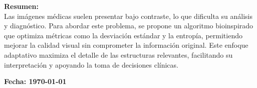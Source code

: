\begin{titlepage}
\begin{center}
\begin{minipage}{0.8\textwidth}
        \end{minipage}

        \begin{minipage}{0.8\textwidth}
            \textbf{Resumen:}\\[0.3cm]
            Las imágenes médicas suelen presentar bajo contraste, lo que dificulta su análisis y diagnóstico. Para abordar este problema, se propone un algoritmo bioinspirado que optimiza métricas como la desviación estándar y la entropía, permitiendo mejorar la calidad visual sin comprometer la información original. Este enfoque adaptativo maximiza el detalle de las estructuras relevantes, facilitando su interpretación y apoyando la toma de decisiones clínicas.
        \end{minipage}
        
        \vspace{0.3cm}

        \textbf{\large Fecha: \today}

    \end{center}
\end{titlepage}
